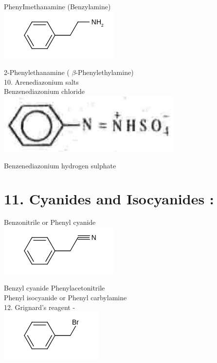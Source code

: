 \documentclass[10pt]{article}
\begin{document}
PhenyImethanamine (Benzylamine)\\
\includegraphics{smile-806f80fb3898992add0f4b9890eeef8e652c2e47}

2-Phenylethanamine ( $\beta$-Phenylethylamine)\\
10. Arenediazonium salts\\


Benzenediazonium chloride\\
\includegraphics[max width=\textwidth, center]{2025_01_28_8470952b98110cec3aabg-032(1)}

Benzenediazonium hydrogen sulphate

\section*{11. Cyanides and Isocyanides :}


Benzonitrile or Phenyl cyanide\\
\includegraphics{smile-27aa45f28b248fde3d9fc9fec2ad4df3009be27c}

Benzyl cyanide Phenylacetonitrile\\


Phenyl isocyanide or Phenyl carbylamine\\
12. Grignard's reagent -\\
\includegraphics{smile-e4ea1fa2879cd4c58d0ca0a96867ae8ff0ca5821}
\end{document}
